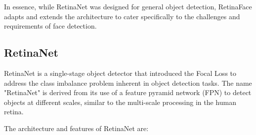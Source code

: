 \documentclass{article}
\begin{document}
In essence, while RetinaNet was designed for general object detection, RetinaFace adapts and extends the architecture to cater specifically to the challenges and requirements of face detection.

\subsection{RetinaNet}

RetinaNet is a single-stage object detector that introduced the Focal Loss to address the class imbalance problem inherent in object detection tasks. The name "RetinaNet" is derived from its use of a feature pyramid network (FPN) to detect objects at different scales, similar to the multi-scale processing in the human retina.

The architecture and features of RetinaNet are:
\end{document}
